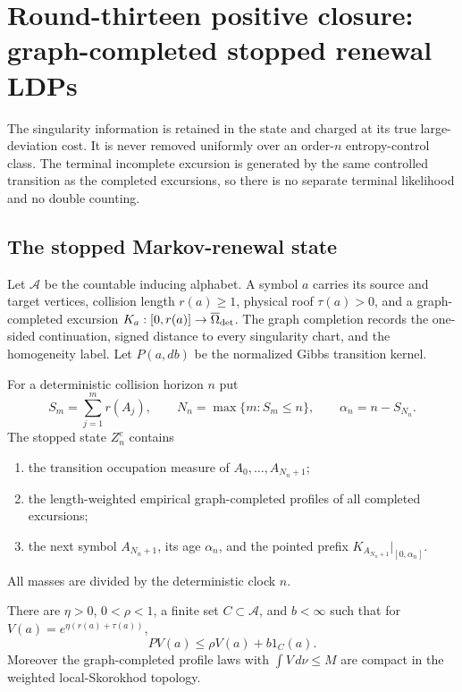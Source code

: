 \section{Round-thirteen positive closure: graph-completed stopped renewal LDPs}
\label{sec:r13-a3}

The singularity information is retained in the state and charged at its true
large-deviation cost.  It is never removed uniformly over an order-$n$
entropy-control class.  The terminal incomplete excursion is generated by the
same controlled transition as the completed excursions, so there is no
separate terminal likelihood and no double counting.

\subsection{The stopped Markov-renewal state}

Let $\mathcal A$ be the countable inducing alphabet.  A symbol $a$ carries its
source and target vertices, collision length $r(a)\ge1$, physical roof
$\tau(a)>0$, and a graph-completed excursion
$K_a:[0,r(a)]\to\overline\Omega_{\rm det}$.  The graph completion records the
one-sided continuation, signed distance to every singularity chart, and the
homogeneity label.  Let $P(a,db)$ be the normalized Gibbs transition kernel.

For a deterministic collision horizon $n$ put
\[
 S_m=\sum_{j=1}^m r(A_j),\qquad
 N_n=\max\{m:S_m\le n\},\qquad
 \alpha_n=n-S_{N_n}.
\]
The stopped state $Z_n^c$ contains
\begin{enumerate}[label=(\roman*)]
\item the transition occupation measure of $A_0,\ldots,A_{N_n+1}$;
\item the length-weighted empirical graph-completed profiles of all completed
      excursions;
\item the next symbol $A_{N_n+1}$, its age $\alpha_n$, and the pointed prefix
      $K_{A_{N_n+1}}|_{[0,\alpha_n]}$.
\end{enumerate}
All masses are divided by the deterministic clock $n$.

\begin{lemma}
\label{lem:r13-a3-drift}
There are $\eta>0$, $0<\rho<1$, a finite set $C\subset\mathcal A$, and
$b<\infty$ such that for
$V(a)=e^{\eta(r(a)+\tau(a))}$,
\[
 PV(a)\le\rho V(a)+b1_C(a).
\]
Moreover the graph-completed profile laws with
$\int V\,d\nu\le M$ are compact in the weighted local-Skorokhod topology.
\end{lemma}

